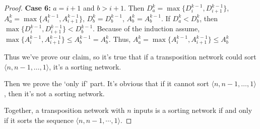\documentclass[12pt,a4paper]{article}
\theoremstyle{definition}
\begin{document}
\begin{enumerate}
\begin{proof}
\textbf{Case 6:} $a=i+1$ and $b>i+1$. Then $D_a^k=\max\{D_i^{k-1},D_{i+1}^{k-1}\}$, $A_a^k=\max\{A_{i}^{k-1},A_{i+1}^{k-1}\}$, $D_b^k=D_b^{k-1}$, $A_b^k=A_b^{k-1}$. If $D_a^k<D_b^k$, then $\max\{D_i^{k-1},D_{i+1}^{k-1}\}<D_b^{k-1}$. Because of the induction assume, $\max\{A_i^{k-1},A_{i+1}^{k-1}\}\leq A_b^{k-1}=A_b^k$. Thus, $A_a^k=\max\{A_i^{k-1},A_{i+1}^{k-1}\}\leq A_b^k$

Thus we've prove our claim, so it's true that if a transposition network could sort $\langle n,n-1,\dots,1\rangle$, it's a sorting network.

Then we prove the `only if' part. It's obvious that if it cannot sort $\langle n,n-1,\dots,1\rangle$, then it's not a sorting network.

Together, a transposition network with $n$ inputs is a sorting network if and only if it sorts the sequence $\langle n, n-1, \cdots, 1 \rangle$.

\end{proof}
\end{enumerate}

\end{document}
